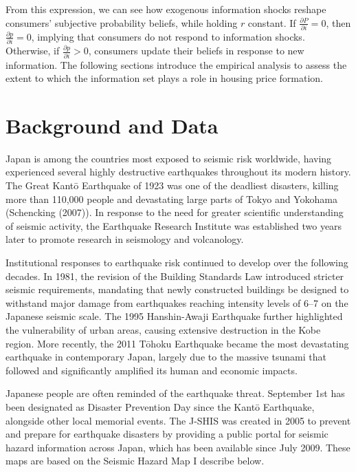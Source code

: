 \documentclass[
  letterpaper,
  DIV=11,
  numbers=noendperiod]{scrartcl}
\begin{document}
From this expression, we can see how exogenous information shocks
reshape consumers' subjective probability beliefs, while holding \(r\)
constant. If \(\frac{\partial P}{\partial i} = 0\), then
\(\frac{\partial p}{\partial i} = 0\), implying that consumers do not
respond to information shocks. Otherwise, if
\(\frac{\partial p}{\partial i} > 0\), consumers update their beliefs in
response to new information. The following sections introduce the
empirical analysis to assess the extent to which the information set
plays a role in housing price formation.

\section{Background and Data}

Japan is among the countries most exposed to seismic risk worldwide,
having experienced several highly destructive earthquakes throughout its
modern history. The Great Kantō Earthquake of 1923 was one of the
deadliest disasters, killing more than 110,000 people and devastating
large parts of Tokyo and Yokohama (Schencking (2007)). In response to
the need for greater scientific understanding of seismic activity, the
Earthquake Research Institute was established two years later to promote
research in seismology and volcanology.

Institutional responses to earthquake risk continued to develop over the
following decades. In 1981, the revision of the Building Standards Law
introduced stricter seismic requirements, mandating that newly
constructed buildings be designed to withstand major damage from
earthquakes reaching intensity levels of 6--7 on the Japanese seismic
scale. The 1995 Hanshin-Awaji Earthquake further highlighted the
vulnerability of urban areas, causing extensive destruction in the Kobe
region. More recently, the 2011 Tōhoku Earthquake became the most
devastating earthquake in contemporary Japan, largely due to the massive
tsunami that followed and significantly amplified its human and economic
impacts.

Japanese people are often reminded of the earthquake threat. September
1st has been designated as Disaster Prevention Day since the Kantō
Earthquake, alongside other local memorial events. The J-SHIS was
created in 2005 to prevent and prepare for earthquake disasters by
providing a public portal for seismic hazard information across Japan,
which has been available since July 2009. These maps are based on the
Seismic Hazard Map I describe below.
\end{document}
